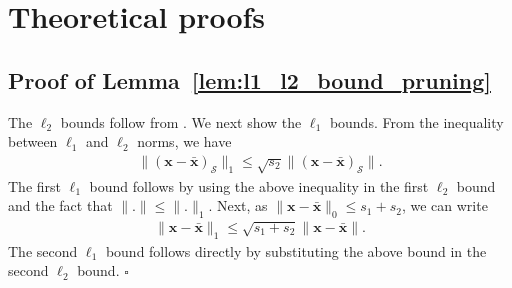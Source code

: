 \documentclass[journal]{IEEEtran}
\newcommand{\mbx}{\mathbf{x}}
\newcommand*{\QEDB}{\hfill\ensuremath{\square}}%
\begin{document}
\section{Theoretical proofs}
\label{sec:Theoretical_proofs}


\subsection{Proof of Lemma~\ref{lem:l1_l2_bound_pruning}}
The $\ell_2$ bounds follow from \cite[Lemma 2]{Liu_improved_SP_analysis_SPL_2014}. We next show the $\ell_1$ bounds. From the inequality between $\ell_1$ and $\ell_2$ norms, we have
\begin{eqnarray*}
\|\left(\mbx-\bar{\mbx}\right)_{\mathcal{S}}\|_1 \leq \sqrt{s_2}\|\left(\mbx-\bar{\mbx}\right)_{\mathcal{S}}\|.
\end{eqnarray*}
The first $\ell_1$ bound follows by using the above inequality in the first $\ell_2$ bound and the fact that $\|.\| \leq \|.\|_1$. Next, as $\|\mbx-\bar{\mbx}\|_0 \leq s_1+s_2$, we can write
\begin{eqnarray*}
\|\mbx-\bar{\mbx}\|_1 \leq \sqrt{s_1+s_2}\|\mbx-\bar{\mbx}\|.
\end{eqnarray*}
The second $\ell_1$ bound follows directly by substituting the above bound in the second $\ell_2$ bound. \QEDB
\end{document}
